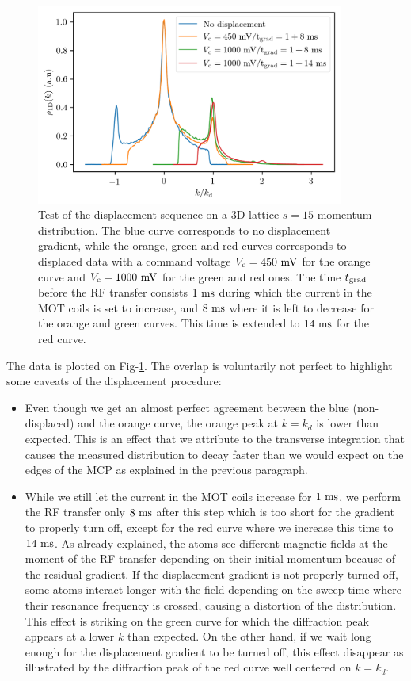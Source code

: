 \begin{figure}
    \centering
    \includegraphics[width=0.9\textwidth]{Fig/Chapter5/overlap.png}
    \caption{Test of the displacement sequence on a 3D lattice $s=15$ momentum distribution. The blue curve corresponds to no displacement gradient, while the orange, green and red curves corresponds to displaced data with a command voltage $V_{\rm{c}}=450 \ \rm{mV}$ for the orange curve and $V_{\rm{c}}=1000 \ \rm{mV}$ for the green and red ones. The time $t_{\rm{grad}}$ before the RF transfer consists $1 \ \rm{ms}$ during which the current in the MOT coils is set to increase, and $8 \ \rm{ms}$ where it is left to decrease for the orange and green curves. This time is extended to $14 \ \rm{ms}$ for the red curve.}
    \label{fig:1D_overlap_mott}
\end{figure}

The data is plotted on Fig-\ref{fig:1D_overlap_mott}. The overlap is voluntarily not perfect to highlight some caveats of the displacement procedure:

\begin{itemize}
    \item Even though we get an almost perfect agreement between the blue (non-displaced) and the orange curve, the orange peak at $k=k_d$ is lower than expected. This is an effect that we attribute to the transverse integration that causes the measured distribution to decay faster than we would expect on the edges of the MCP as explained in the previous paragraph. 
    \item While we still let the current in the MOT coils increase for $1 \ \rm{ms}$, we perform the RF transfer only $8 \ \rm{ms}$ after this step which is too short for the gradient to properly turn off, except for the red curve where we increase this time to $14 \ \rm{ms}$. As already explained, the atoms see different magnetic fields at the moment of the RF transfer depending on their initial momentum because of the residual gradient. If the displacement gradient is not properly turned off, some atoms interact longer with the field depending on the sweep time where their resonance frequency is crossed, causing a distortion of the distribution. This effect is striking on the green curve for which the diffraction peak appears at a lower $k$ than expected. On the other hand, if we wait long enough for the displacement gradient to be turned off, this effect disappear as illustrated by the diffraction peak of the red curve well centered on $k=k_d$.
\end{itemize}

